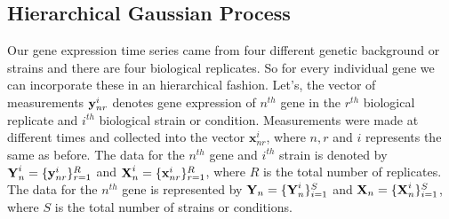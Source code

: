 
\subsection{Hierarchical Gaussian Process}
Our gene expression time series came from four different genetic background or strains and there are four biological replicates. So for every individual gene we can incorporate these in an hierarchical fashion. Let's, the vector of measurements ${\textbf y}^{i}_{nr}$ denotes gene expression of $n^{th}$ gene in the $r^{th}$ biological replicate and $i^{th}$ biological strain or condition. Measurements were made at different times and collected into the vector $\textbf{x}^{i}_{nr}$, where $n, r$ and $i$ represents the same as before. The data for the $n^{th}$ gene and $i^{th}$ strain is denoted by ${\textbf Y}^{i}_n = \{{\textbf y}^{i}_{nr}\}^{R}_{r=1}$ and ${\textbf X}^{i}_n = \{{\textbf x}^{i}_{nr}\}^{R}_{r=1}$, where $R$ is the total number of replicates. The data for the $n^{th}$ gene is represented by ${\textbf Y}_n = \{{\textbf Y}^{i}_{n}\}^{S}_{i=1}$ and ${\textbf X}_n = \{{\textbf X}^{i}_{n}\}^{S}_{i=1}$, where $S$ is the total number of strains or conditions.

